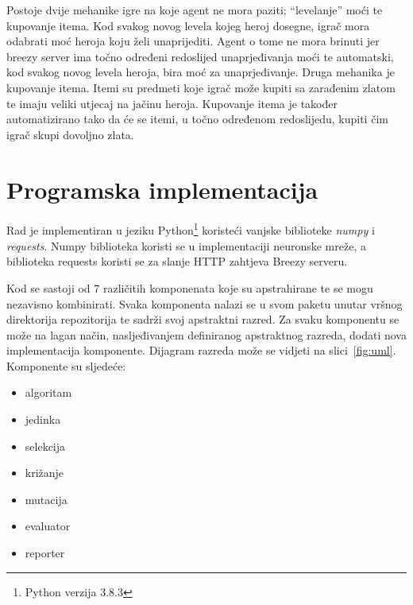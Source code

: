 \documentclass[times, utf8, zavrsni, numeric]{fer}
\begin{document}
Postoje dvije mehanike igre na koje agent ne mora paziti; ``levelanje'' moći te
kupovanje itema.\citep{project-breezy} Kod svakog novog levela kojeg heroj
dosegne, igrač mora odabrati moć heroja koju želi unaprijediti. Agent o tome ne
mora brinuti jer breezy server ima točno određeni redoslijed unaprjeđivanja moći
te automatski, kod svakog novog levela heroja, bira moć za unaprjeđivanje.
Druga mehanika je kupovanje itema. Itemi su predmeti koje igrač može kupiti sa
zarađenim zlatom te imaju veliki utjecaj na jačinu heroja. Kupovanje itema je
također automatizirano tako da će se itemi, u točno određenom redoslijedu,
kupiti čim igrač skupi dovoljno zlata.


\chapter{Programska implementacija}\label{chapter:implementacija}

Rad je implementiran u jeziku Python\footnote{Python verzija 3.8.3} koristeći
vanjske biblioteke \emph{numpy} i \emph{requests}. Numpy biblioteka koristi se u
implementaciji neuronske mreže, a biblioteka requests koristi se za slanje HTTP
zahtjeva Breezy serveru.

Kod se sastoji od 7 različitih komponenata koje su apstrahirane te se mogu
nezavisno kombinirati. Svaka komponenta nalazi se u svom paketu unutar vršnog
direktorija repozitorija te sadrži svoj apstraktni razred. Za svaku komponentu
se može na lagan način, nasljeđivanjem definiranog apstraktnog razreda, dodati
nova implementacija komponente. Dijagram razreda može se vidjeti na
slici~\ref{fig:uml}. Komponente su sljedeće:
\begin{itemize}
        \item algoritam 
        \item jedinka 
        \item selekcija
        \item križanje 
        \item mutacija 
        \item evaluator
        \item reporter
\end{itemize}
\end{document}

